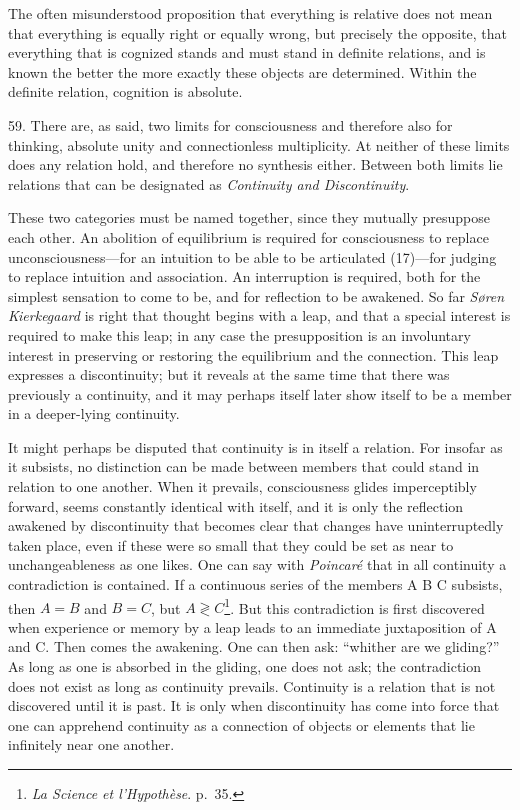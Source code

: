 \documentclass[12pt,a4paper]{book}
\newcommand{\opage}[1]{\marginnote{\footnotesize\textit{[#1]}}}
\begin{document}
The often misunderstood proposition that everything is relative does not
mean that everything is equally right or equally wrong, but precisely the
opposite, that everything that is cognized stands and must stand in definite
relations, and is known the better the more exactly these objects are
determined. Within the definite relation, cognition is absolute.

59. There are, as said, two limits for consciousness and therefore also for
thinking, absolute unity and connectionless multiplicity. At neither of
these limits does any relation hold, and therefore no synthesis either.
Between both limits lie relations that can be designated as \emph{Continuity
and Discontinuity}.

These two categories must be named together, since they mutually presuppose
each other. An abolition of equilibrium is required for consciousness to
replace unconsciousness---for an intuition to be able to be articulated
(17)---for judging to replace intuition and association. An interruption is
required, both for the simplest sensation to come to be, and for reflection
to be awakened. So far \emph{Søren Kierkegaard} is right that thought begins
with a leap, and that a special interest is required to make this leap; in
any case the presupposition is an involuntary interest in preserving or
restoring the equilibrium and the connection. This leap expresses a
discontinuity; but it reveals at the same time that there was previously a
continuity, and it may perhaps itself later show itself to be a member in a
deeper-lying continuity.

It might perhaps be disputed that continuity \opage{157}is in itself a relation. For
insofar as it subsists, no distinction can be made between members that
could stand in relation to one another. When it prevails, consciousness
glides imperceptibly forward, seems constantly identical with itself, and it
is only the reflection awakened by discontinuity that becomes clear that
changes have uninterruptedly taken place, even if these were so small that
they could be set as near to unchangeableness as one likes. One can say with
\emph{Poincaré} that in all continuity a contradiction is contained. If a
continuous series of the members A B C subsists, then $A = B$ and $B = C$,
but $A \gtrless C$\footnote{\emph{La Science et l'Hypothèse}. p.~35.}. But
this contradiction is first discovered when experience or memory by a leap
leads to an immediate juxtaposition of A and C. Then comes the awakening.
One can then ask: ``whither are we gliding?'' As long as one is absorbed in
the gliding, one does not ask; the contradiction does not exist as long as
continuity prevails. Continuity is a relation that is not discovered until
it is past. It is only when discontinuity has come into force that one can
apprehend continuity as a connection of objects or elements that lie
infinitely near one another.
\end{document}
